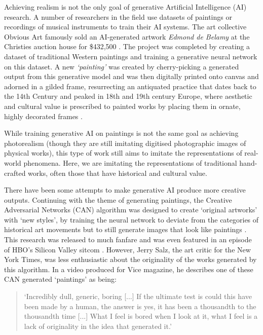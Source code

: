 Achieving realism is not the only goal of generative Artificial Intelligence (AI) research. 
A number of researchers in the field use datasets of paintings or recordings of musical instruments to train their AI systems. 
The art collective Obvious Art famously sold an AI-generated artwork \textit{Edmond de Belamy} at the Christies auction house for \$432,500 \citep{christies2018edmond}.
The project was completed by creating a dataset of traditional Western paintings and training a generative neural network on this dataset. 
A new \textit{`painting’} was created by cherry-picking a generated output from this generative model and was then digitally printed onto canvas and adorned in a gilded frame, resurrecting an antiquated practice that dates back to the 14th Century and peaked in 18th and 19th century Europe, where aesthetic and cultural value is prescribed to painted works by placing them in ornate, highly decorated frames \citep{kiilerich2001savedoff}.

While training generative AI on paintings is not the same goal as achieving photorealism (though they are still imitating digitised photographic images of physical works), this type of work still aims to imitate the representations of real-world phenomena. Here, we are imitating the representations of traditional hand-crafted works, often those that have historical and cultural value.

There have been some attempts to make generative AI produce more creative outputs. 
Continuing with the theme of generating paintings, the Creative Adversarial Networks (CAN) algorithm was designed to create ‘original artworks’ with ‘new styles’, by training the neural network to deviate from the categories of historical art movements but to still generate images that look like paintings \citep{elgammal2017can}. 
This research was released to much fanfare and was even featured in an episode of HBO’s Silicon Valley sitcom \citep{elhoseiny2019hbo}. 
However, Jerry Salz, the art critic for the New York Times, was less enthusiastic about the originality of the works generated by this algorithm. 
In a video produced for Vice magazine, he describes one of these CAN generated `paintings' as being:

\begin{quote}
`Incredibly dull, generic, boring [...] If the ultimate test is could this have been made by a human, the answer is yes, it has been a thousandth to the thousandth time [...] What I feel is bored when I look at it, what I feel is a lack of originality in the idea that generated it.' \citep{saltz2018aiart}
\end{quote}

